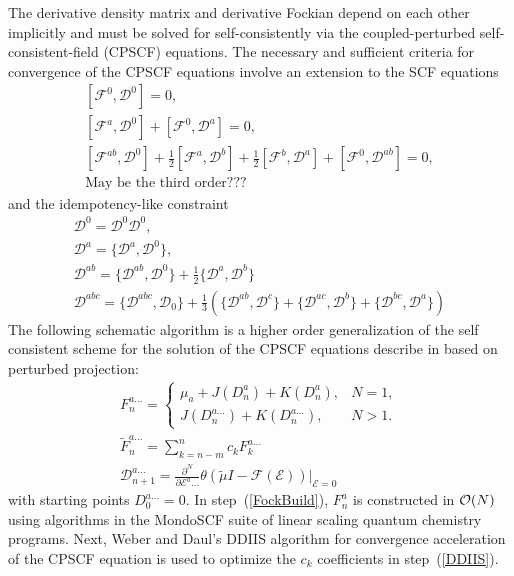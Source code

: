 \documentclass[prl,aps,twocolumn,showpacs,twocolumngrid,superbib]{revtex4}
\def\F{\mathcal{F}}
\def\D{\mathcal{D}}
\def\E{\mathcal{E}}
\begin{document}
The derivative density matrix and derivative Fockian depend on 
each other implicitly and must be solved for self-consistently 
via the coupled-perturbed self-consistent-field (CPSCF) equations.
The necessary and sufficient criteria for convergence of the 
CPSCF equations involve an extension to the SCF equations \cite{Furche_2001}
\begin{subequations}
  \begin{gather}
    [\F^{0} ,\D^{0}]=0,\\
    [\F^{a} ,\D^{0}]+[\F^{0},\D^{a}]=0,\\
    [\F^{ab},\D^{0}]+\frac{1}{2}[\F^{a},\D^{b}]+\frac{1}{2}[\F^{b} ,\D^{a}]+[\F^{0},\D^{ab}]=0,\\
    \text{May be the third order???}
  \end{gather}
\end{subequations}
and the idempotency-like constraint \cite{Furche_2001}
\begin{subequations}
  \begin{gather}
    \D^{0} =\D^{0} \D^{0},\\
    \D^{a} =\{\D^{a},\D^{0}\},\\
    \D^{ab}=\{\D^{ab},\D^{0}\}+\frac{1}{2}\{\D^{a},\D^{b}\}\\
    \D^{abc}=\{\D^{abc},\D_0\}+
        \frac{1}{3}(\{\D^{ab},\D^{c}\}+\{\D^{ac},\D^{b}\}+\{\D^{bc},\D^{a}\})
  \end{gather}
\end{subequations}
The following schematic algorithm is a higher order generalization of the
self consistent scheme for the solution of the CPSCF equations describe 
in \cite{Weber04} based on perturbed projection:
\begin{subequations}
  \begin{gather}
F^{a\ldots}_{n}= \left\{
\begin{array}{ll}
\mu_a+J(D^{a}_n)+K(D^{a}_n), & N=1\label{FockBuild},\\
J(D^{a\ldots}_n)+K(D^{a\ldots}_n), & N>1.
\end{array}\right.\\
    \displaystyle\widetilde{F}^{a\ldots}_{n}=\sum_{k=n-m}^{n}c_k F^{a\ldots}_{k} \label{DDIIS} \\
    \displaystyle\D^{a\ldots}_{n+1}=
    \frac{\partial^N}{\partial\E^a\ldots}\theta(\tilde{\mu}I-
    \F(\E))\bigg|_{\E=0} \label{DDeriv}
  \end{gather} 
\end{subequations}
with starting points $D^{a\ldots}_0=0$. In step~(\ref{FockBuild}),  
$F^a_n$ is constructed in ${\cal O}(N)$ using algorithms 
\cite{MChallacombe97,ESchwegler97} in the {\sc MondoSCF} \cite{MondoSCF} 
suite of linear scaling quantum chemistry programs.  Next,
Weber and Daul's DDIIS algorithm for convergence acceleration 
of the CPSCF equation \cite{Weber_2003} is used to optimize 
the $c_k$ coefficients in step~(\ref{DDIIS}).
\end{document}

